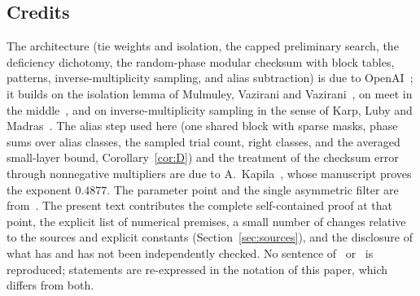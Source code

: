 \documentclass[11pt]{article}
\theoremstyle{definition}
\begin{document}
\subsection{Credits}
The architecture (tie weights and isolation, the capped preliminary search, the deficiency dichotomy, the
random-phase modular checksum with block tables, patterns, inverse-multiplicity sampling, and alias subtraction) is
due to OpenAI~\cite{OAI}; it builds on the isolation lemma of Mulmuley, Vazirani and Vazirani~\cite{MVV}, on meet in
the middle~\cite{HS}, and on inverse-multiplicity sampling in the sense of Karp, Luby and Madras~\cite{KLM}. The alias step used here (one shared block with sparse masks, phase sums over alias
classes, the sampled trial count, right classes, and the averaged small-layer bound, Corollary~\ref{cor:D}) and the
treatment of the checksum error through nonnegative multipliers are due to A.~Kapila~\cite{Base}, whose manuscript
proves the exponent $0.4877$. The parameter point and the single asymmetric filter are from~\cite{V}. The present
text contributes the complete self-contained proof at that point, the explicit list of numerical premises, a small
number of changes relative to the sources and explicit constants (Section~\ref{sec:sources}), and the disclosure of what has and has not
been independently checked. No sentence of~\cite{OAI} or~\cite{Base} is reproduced; statements are re-expressed in
the notation of this paper, which differs from both.
\end{document}

